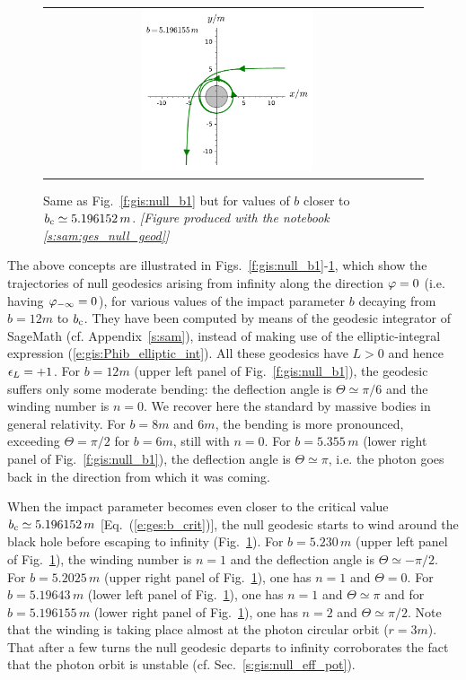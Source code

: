 \begin{figure}
\begin{tabular}{cc}
\includegraphics[width=0.48\textwidth]{ges_null_b_5_196155.pdf}
\end{tabular}
\caption[]{\label{f:gis:null_b2} \footnotesize
Same as Fig.~\ref{f:gis:null_b1} but for values of $b$ closer to
$b_{\rm c} \simeq 5.196152\, m$.
\textsl{[Figure produced with the notebook \ref{s:sam:ges_null_geod}]}
}
\end{figure}

The above concepts are illustrated in Figs.~\ref{f:gis:null_b1}-\ref{f:gis:null_b2},
which show the trajectories
of null geodesics arising from infinity along the
direction $\varphi=0$ (i.e. having $\varphi_{-\infty}=0$), for various values of the
impact parameter $b$ decaying from $b=12 m$ to $b_{\rm c}$.
They have been computed by means of the geodesic integrator
of \textsf{SageMath} (cf. Appendix~\ref{s:sam}), instead of making use
of the elliptic-integral expression (\ref{e:gis:Phib_elliptic_int}).
All these geodesics have $L>0$ and hence $\epsilon_L = +1$.
For $b=12 m$ (upper left panel of Fig.~\ref{f:gis:null_b1}),
the geodesic suffers only some moderate bending: the deflection angle is
$\Theta\simeq \pi/6$ and the winding number is $n=0$.
We recover here the standard
 by massive bodies in
general relativity.
For $b=8 m$ and $6 m$, the bending is more pronounced,
exceeding $\Theta = \pi/2$ for $b=6 m$, still with $n=0$. For $b=5.355\, m$ (lower right panel of Fig.~\ref{f:gis:null_b1}), the deflection angle is $\Theta\simeq\pi$, i.e. the photon goes back in the direction
from which it was coming.

When the impact parameter becomes even closer to the critical value
$b_{\rm c}\simeq 5.196152\, m$ [Eq.~(\ref{e:ges:b_crit})],
the null geodesic starts to wind around the black hole before escaping
to infinity (Fig.~\ref{f:gis:null_b2}).
For $b=5.230\, m$ (upper left panel of Fig.~\ref{f:gis:null_b2}), the winding
number is
$n=1$ and the deflection angle is $\Theta\simeq -\pi/2$.
For $b=5.2025\, m$ (upper right panel of Fig.~\ref{f:gis:null_b2}), one has
$n=1$ and $\Theta=0$. For $b=5.19643\, m$ (lower left panel
of Fig.~\ref{f:gis:null_b2}), one has
$n=1$ and $\Theta\simeq \pi$ and for $b=5.196155\, m$ (lower right panel of Fig.~\ref{f:gis:null_b2}), one has $n=2$ and
$\Theta\simeq \pi/2$.
Note that the winding is taking place
almost at the photon circular orbit ($r=3m$). That after a few turns the null geodesic
departs to infinity corroborates the fact that the photon orbit is unstable
(cf. Sec.~\ref{s:gis:null_eff_pot}).


